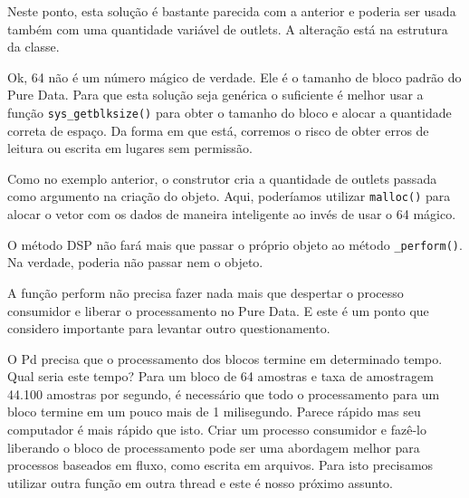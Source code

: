 

Neste ponto, esta solução é bastante parecida com a anterior e poderia ser usada também com uma quantidade
variável de outlets. A alteração está na estrutura da classe.



Ok, 64 não é um número mágico de verdade. Ele é o tamanho de bloco padrão do
Pure Data. Para que esta solução seja genérica o suficiente é melhor usar a
função \texttt{sys\_getblksize()} para obter o tamanho do bloco e alocar
a quantidade correta de espaço. Da forma em que está, corremos o risco de
obter erros de leitura ou escrita em lugares sem permissão. 



Como no exemplo anterior, o construtor cria a quantidade de outlets passada
como argumento na criação do objeto. Aqui, poderíamos utilizar
\texttt{malloc()} para alocar o vetor com os dados de maneira inteligente ao
invés de usar o 64 mágico.



O método DSP não fará mais que passar o próprio objeto ao método
\texttt{\_perform()}. Na verdade, poderia não passar nem o objeto.



A função perform não precisa fazer nada mais que despertar o processo
consumidor e liberar o processamento no Pure Data. E este é um ponto que
considero importante para levantar outro questionamento.

O Pd precisa que o processamento dos blocos termine em determinado tempo. Qual
seria este tempo? Para um bloco de 64 amostras e taxa de amostragem 44.100
amostras por segundo, é necessário que todo o processamento para um bloco
termine em um pouco mais de 1 milisegundo. Parece rápido mas seu computador é
mais rápido que isto. Criar um processo consumidor e fazê-lo liberando
 o bloco de processamento pode ser uma abordagem
melhor para processos baseados em fluxo, como escrita em arquivos. Para isto
precisamos utilizar outra função em outra thread e este é nosso próximo
assunto.

